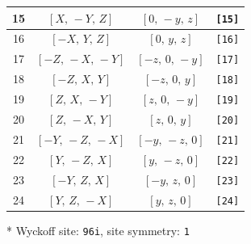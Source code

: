 \documentclass[fleqn,8pt]{jsarticle}
\begin{document}
\begin{longtable}{cccc}
15 & $\left[ X,\, - Y,\, Z \right]$ & $\left[ 0,\, - y,\, z \right]$ & {\tt [15]} \\ \hline
16 & $\left[ - X,\, Y,\, Z \right]$ & $\left[ 0,\, y,\, z \right]$ & {\tt [16]} \\ \hline
17 & $\left[ - Z,\, - X,\, - Y \right]$ & $\left[ - z,\, 0,\, - y \right]$ & {\tt [17]} \\ \hline
18 & $\left[ - Z,\, X,\, Y \right]$ & $\left[ - z,\, 0,\, y \right]$ & {\tt [18]} \\ \hline
19 & $\left[ Z,\, X,\, - Y \right]$ & $\left[ z,\, 0,\, - y \right]$ & {\tt [19]} \\ \hline
20 & $\left[ Z,\, - X,\, Y \right]$ & $\left[ z,\, 0,\, y \right]$ & {\tt [20]} \\ \hline
21 & $\left[ - Y,\, - Z,\, - X \right]$ & $\left[ - y,\, - z,\, 0 \right]$ & {\tt [21]} \\ \hline
22 & $\left[ Y,\, - Z,\, X \right]$ & $\left[ y,\, - z,\, 0 \right]$ & {\tt [22]} \\ \hline
23 & $\left[ - Y,\, Z,\, X \right]$ & $\left[ - y,\, z,\, 0 \right]$ & {\tt [23]} \\ \hline
24 & $\left[ Y,\, Z,\, - X \right]$ & $\left[ y,\, z,\, 0 \right]$ & {\tt [24]} \\
\end{longtable}
* Wyckoff site: {\tt 96i}, site symmetry: {\tt 1}
\renewcommand{\arraystretch}{1.2}
\end{document}
